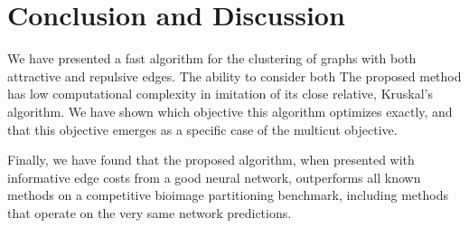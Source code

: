 
\section{Conclusion and Discussion} \label{Conclusion}
We have presented a fast algorithm for the clustering of graphs with both attractive and repulsive edges. The ability to consider both
 The proposed method has low computational complexity in imitation of its close relative, Kruskal's algorithm. We have shown which objective this algorithm optimizes exactly, and that this objective emerges as a specific case of the multicut objective. 

Finally, we have found that the proposed algorithm, when presented with informative edge costs from a good neural network, outperforms all known methods on a competitive bioimage partitioning benchmark, including methods that operate on the very same network predictions. 




